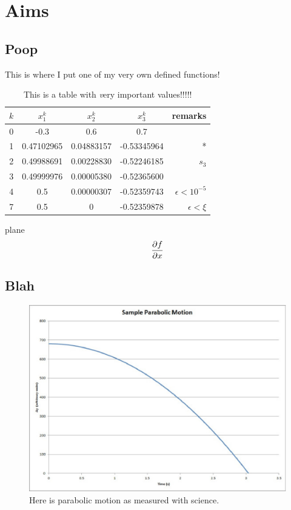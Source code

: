\chapter{Aims}

\ifpdf
    \graphicspath{{example_chapter/figures/PNG/}{example_chapter/figures/PDF/}{example_chapter/figures/}}
\else
    \graphicspath{{example_chapter/figures/EPS/}{example_chapter/figures/}}
\fi



\section{Poop}
This is where I put one of my very own defined functions!

\begin{table}
\centering
\begin{tabular}{|c|ccc|r|}
	\hline
$k$ &  $x_1^k$    &   $x_2^k$  & $x_3^k$   & remarks  \\
	\hline
0   & -0.3 & 0.6 & 0.7  &  \\
1   & 0.47102965 & 0.04883157 & -0.53345964  & *\\
2   & 0.49988691 & 0.00228830 & -0.52246185 & $s_3$ \\
3   & 0.49999976 & 0.00005380 & -0.52365600  & \\
4   & 0.5 & 0.00000307 & -0.52359743  & $\epsilon < 10^{-5}$ \\
7   & 0.5 & 0 & -0.52359878  & $\epsilon < \xi $ \\
	\hline
\end{tabular}
\caption[A table of important values]{This is a table with {\emph very} important values!!!!!}
\label{important_values}
\end{table}
    
\uv plane
    $$ \frac{\partial f}{\partial x} $$

\section{Blah} 
\lipsum
\begin{figure}
\centering
\includegraphics{parabolic_motion}
\caption[Parabolic Motion]{Here is parabolic motion as measured with science.}
\label{parabolic_motion}
\end{figure}
\lipsum
